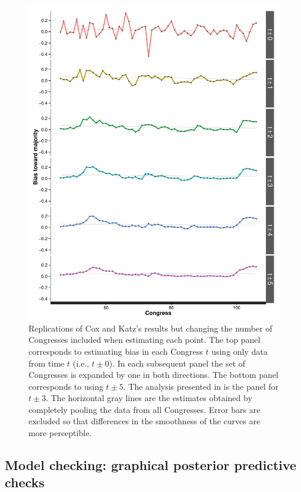 \begin{figure}
\centering
\includegraphics[scale=0.75]{sections/figs/ck_hypothetical}
\caption{Replications of Cox and Katz's results but changing the number of Congresses 
included when estimating each point. The top panel corresponds to estimating bias in each 
Congress $t$ using only data from time $t$ (i.e., $t \pm 0$). In each subsequent panel the 
set of Congresses is expanded by one in both directions. The bottom panel corresponds to 
using $t \pm 5$. The analysis presented in \protect{} is the 
panel for $t \pm 3$. The horizontal gray lines are the estimates obtained by completely 
pooling the data from all Congresses. Error bars are excluded so that differences in the 
smoothness of the curves are more perceptible.}
\label{fig:ck_hypothetical}
\end{figure}




\subsection{Model checking: graphical posterior predictive checks}
\label{subsection_model_checking}

